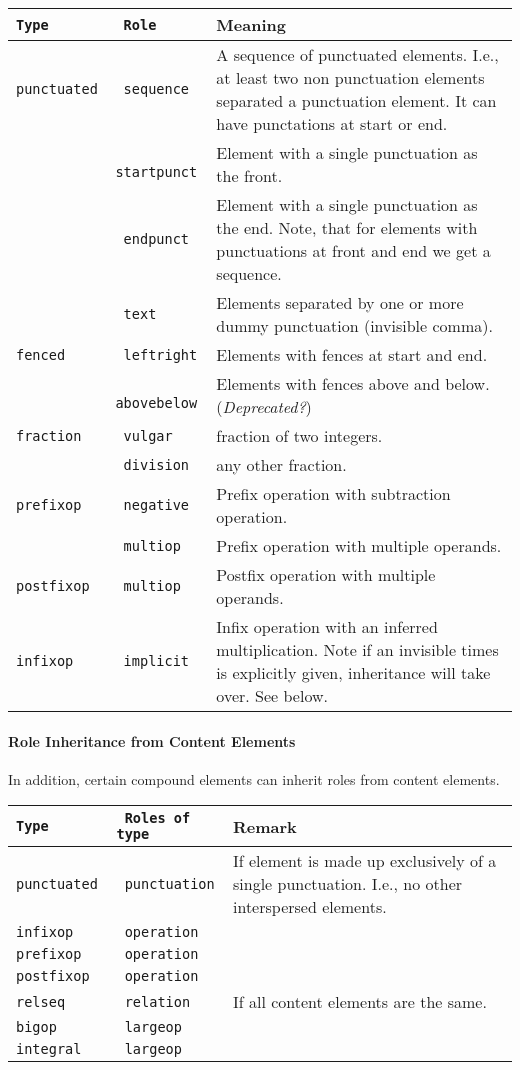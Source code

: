 \documentclass{article}
\def\depr#1{#1 (\textit{Deprecated?})}
\begin{document}
\begin{tabular}{>{\tt}l>{\tt}lp{11cm}}
  Type & Role & Meaning\\\hline
  punctuated & sequence & A sequence of punctuated elements. I.e., at least two non punctuation elements
                          separated a punctuation element. It can have punctations at start or end.\\
       & startpunct & Element with a single punctuation as the front.\\
       & endpunct & Element with a single punctuation as the end. Note, that for elements with
                    punctuations at front and end we get a sequence.\\
       & text & Elements separated by one or more dummy punctuation (invisible comma).\\
  fenced & leftright & Elements with fences at start and end.\\
       & abovebelow & \depr{Elements with fences above and below.} \\
  fraction & vulgar & fraction of two integers.\\
       & division & any other fraction.\\
  prefixop & negative & Prefix operation with subtraction operation.\\
       & multiop & Prefix operation with multiple operands.\\
  postfixop & multiop & Postfix operation with multiple operands.\\
  infixop & implicit & Infix operation with an inferred multiplication. Note if an invisible times 
                       is explicitly given, inheritance will take over. See below.\\
\end{tabular}


\paragraph{Role Inheritance from Content Elements}
In addition, certain compound elements can inherit roles from content elements.

\begin{tabular}{>{\tt}l>{\tt}lp{10cm}}
  Type & Roles of type & Remark \\\hline
  punctuated & punctuation & If element is made up exclusively of a single punctuation.
                             I.e., no other interspersed elements.\\
  infixop & operation & \\
  prefixop & operation & \\
  postfixop & operation & \\
  relseq & relation & If all content elements are the same.\\
  bigop & largeop & \\
  integral & largeop & \\
\end{tabular}
         
\end{document}
